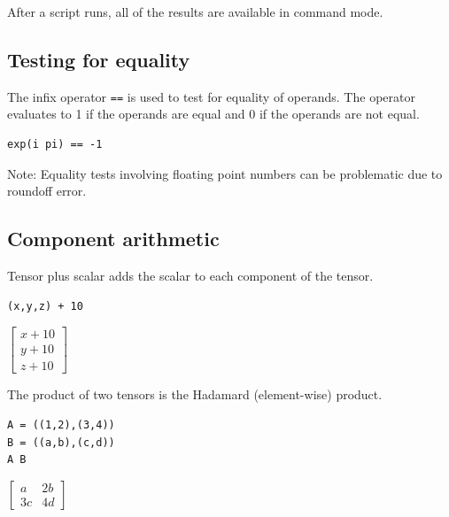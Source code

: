 \documentclass[12pt]{article}
\begin{document}
After a script runs, all of the results are available in command mode.

\newpage





\subsection{Testing for equality}
The infix operator \verb$==$ is used to test for equality of operands.
The operator evaluates to 1 if the operands are equal and 0 if the operands are not equal.

\begin{Verbatim}[formatcom=\color{blue}]
exp(i pi) == -1
\end{Verbatim}


\bigskip
\noindent
Note: Equality tests involving floating point numbers
can be problematic due to roundoff error.











\subsection{Component arithmetic}

\noindent
Tensor plus scalar adds the scalar to each component of the tensor.

{\color{blue}\begin{verbatim}
(x,y,z) + 10
\end{verbatim}}

\noindent
$\begin{bmatrix}x+10\\y+10\\z+10\end{bmatrix}$

\bigskip
\noindent
The product of two tensors is the Hadamard (element-wise) product.

{\color{blue}\begin{verbatim}
A = ((1,2),(3,4))
B = ((a,b),(c,d))
A B
\end{verbatim}}

\noindent
$\begin{bmatrix}a&2b\\3c&4d\end{bmatrix}$
\end{document}
